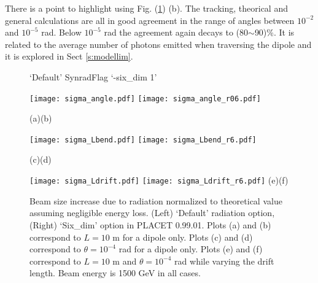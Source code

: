 There is a point to highlight using Fig. (\ref{figSR}) (b). The tracking, theorical and general calculations are all in good agreement in the range of angles between $10^{-2}$ and $10^{-5}$ rad. Below $10^{-5}$ rad the agreement again decays to (80$\sim$90)\%. It is related to the average number of photons emitted when traversing the dipole and it is explored in Sect \ref{s:modellim}.\par
\begin{figure}[htb]
\centering
  \hspace*{1.2cm}`Default' Synrad\hspace*{5.0cm}Flag `-six\_dim 1'\par
 \texttt{[image: sigma\_angle.pdf]}
  \texttt{[image: sigma\_angle\_r06.pdf]}\par
  \hspace*{1.0cm}(a)\hspace*{7.6cm}(b)\par
   \texttt{[image: sigma\_Lbend.pdf]}
  \texttt{[image: sigma\_Lbend\_r6.pdf]}\par
  \hspace*{1.0cm}(c)\hspace*{7.6cm}(d)\par
  \texttt{[image: sigma\_Ldrift.pdf]}
  \texttt{[image: sigma\_Ldrift\_r6.pdf]}
  \hspace*{1.0cm}(e)\hspace*{7.6cm}(f)\par
\caption{Beam size increase due to radiation normalized to theoretical value assuming negligible energy loss. (Left) `Default' radiation option, (Right) `Six\_dim' option in PLACET 0.99.01. Plots (a) and (b) correspond to $L=10$ m for a dipole only. Plots (c) and (d) correspond to $\theta=10^{-4}$ rad for a dipole only. Plots (e) and (f) correspond to $L=10$ m and $\theta=10^{-4}$ rad while varying the drift length. Beam energy is 1500 GeV in all cases.}\label{figSR}
\end{figure}
\clearpage
